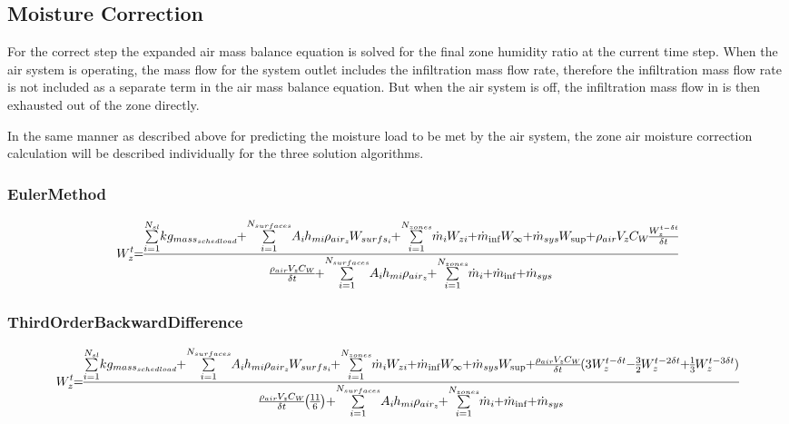\subsection{Moisture Correction}\label{moisture-correction}

For the correct step the expanded air mass balance equation is solved for the final zone humidity ratio at the current time step. When the air system is operating, the mass flow for the system outlet includes the infiltration mass flow rate, therefore the infiltration mass flow rate is not included as a separate term in the air mass balance equation. But when the air system is off, the infiltration mass flow in is then exhausted out of the zone directly.

In the same manner as described above for predicting the moisture load to be met by the air system, the zone air moisture correction calculation will be described individually for the three solution algorithms.

\subsubsection{EulerMethod}\label{eulermethod-1-001}

\begin{equation}
\medmuskip=0mu
\thinmuskip=0mu
\thickmuskip=0mu
\nulldelimiterspace=0pt
\scriptspace=0pt
W_z^t = \frac{{\sum\limits_{i = 1}^{{N_{sl}}} {k{g_{mas{s_{sched\;load}}}}}  + \sum\limits_{i = 1}^{{N_{surfaces}}} {{A_i}{h_{mi}}} {\rho_{ai{r_z}}}{W_{surf{s_i}}} + \sum\limits_{i = 1}^{{N_{zones}}} {{{\dot m}_i}} {W_{zi}} + {{\dot m}_{\inf }}{W_\infty } + {{\dot m}_{sys}}{W_{\sup }} + {\rho_{air}}{V_z}{C_W}\frac{{W_z^{t - \delta t}}}{{\delta t}}}}{{\frac{{{\rho_{air}}{V_z}{C_W}}}{{\delta t}} + \sum\limits_{i = 1}^{{N_{surfaces}}} {{A_i}{h_{mi}}{\rho_{ai{r_z}}}}  + \sum\limits_{i = 1}^{{N_{zones}}} {{{\dot m}_i}}  + {{\dot m}_{\inf }} + {{\dot m}_{sys}}}}
\end{equation}

\subsubsection{ThirdOrderBackwardDifference}\label{thirdorderbackwarddifference-1-001}

\begin{equation}
\medmuskip=0mu
\thinmuskip=0mu
\thickmuskip=0mu
\nulldelimiterspace=0pt
\scriptspace=0pt
W_z^t = \frac{{\sum\limits_{i = 1}^{{N_{sl}}} {k{g_{mas{s_{sched\;load}}}}}  + \sum\limits_{i = 1}^{{N_{surfaces}}} {{A_i}{h_{mi}}} {\rho_{ai{r_z}}}{W_{surf{s_i}}} + \sum\limits_{i = 1}^{{N_{zones}}} {{{\dot m}_i}} {W_{zi}} + {{\dot m}_{\inf }}{W_\infty } + {{\dot m}_{sys}}{W_{\sup }} + \frac{{{\rho_{air}}{V_z}{C_W}}}{{\delta t}}(3W_z^{t - \delta t} - \frac{3}{2}W_z^{t - 2\delta t} + \frac{1}{3}W_z^{t - 3\delta t})}}{{\frac{{{\rho_{air}}{V_z}{C_W}}}{{\delta t}}\left( {\frac{{11}}{6}} \right) + \sum\limits_{i = 1}^{{N_{surfaces}}} {{A_i}{h_{mi}}{\rho_{ai{r_z}}}}  + \sum\limits_{i = 1}^{{N_{zones}}} {{{\dot m}_i}}  + {{\dot m}_{\inf }} + {{\dot m}_{sys}}}}
\end{equation}

